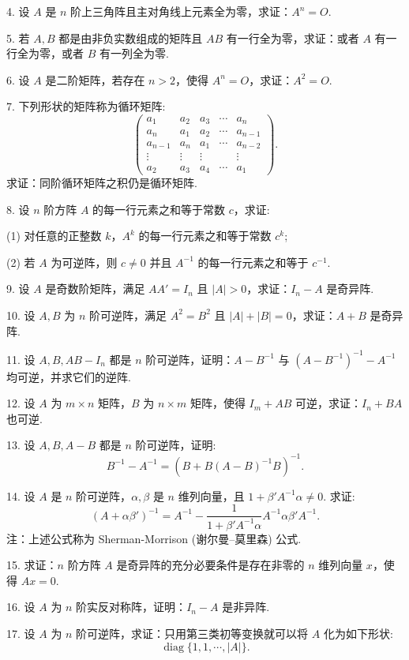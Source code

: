 \documentclass[UTF8,12pt,a4paper,fontset=fandol]{ctexart}
\begin{document}
4. 设 $A$ 是 $n$ 阶上三角阵且主对角线上元素全为零，求证：$A^n=O$.

5. 若 $A,B$ 都是由非负实数组成的矩阵且 $AB$ 有一行全为零，求证：或者 $A$ 有一行全为零，或者 $B$ 有一列全为零.

6. 设 $A$ 是二阶矩阵，若存在 $n>2$，使得 $A^n=O$，求证：$A^2=O$.

7. 下列形状的矩阵称为循环矩阵:
\[
\left(\begin{array}{ccccc}
a_1 & a_2 & a_3 & \cdots & a_n\\
a_n & a_1 & a_2 & \cdots & a_{n-1}\\
a_{n-1} & a_n & a_1 & \cdots & a_{n-2}\\
\vdots & \vdots & \vdots & & \vdots\\
a_2 & a_3 & a_4 & \cdots & a_1
\end{array}\right).
\]
求证：同阶循环矩阵之积仍是循环矩阵.

8. 设 $n$ 阶方阵 $A$ 的每一行元素之和等于常数 $c$，求证:

(1) 对任意的正整数 $k$，$A^k$ 的每一行元素之和等于常数 $c^k$;

(2) 若 $A$ 为可逆阵，则 $c\neq 0$ 并且 $A^{-1}$ 的每一行元素之和等于 $c^{-1}$.

9. 设 $A$ 是奇数阶矩阵，满足 $AA'=I_n$ 且 $|A|>0$，求证：$I_n-A$ 是奇异阵.

10. 设 $A,B$ 为 $n$ 阶可逆阵，满足 $A^2=B^2$ 且 $|A|+|B|=0$，求证：$A+B$ 是奇异阵.

11. 设 $A,B,AB-I_n$ 都是 $n$ 阶可逆阵，证明：$A-B^{-1}$ 与 $(A-B^{-1})^{-1}-A^{-1}$ 均可逆，并求它们的逆阵.

12. 设 $A$ 为 $m\times n$ 矩阵，$B$ 为 $n\times m$ 矩阵，使得 $I_m+AB$ 可逆，求证：$I_n+BA$ 也可逆.

13. 设 $A,B,A-B$ 都是 $n$ 阶可逆阵，证明:
\[
B^{-1}-A^{-1}=\left(B+B(A-B)^{-1}B\right)^{-1}.
\]

14. 设 $A$ 是 $n$ 阶可逆阵，$\alpha,\beta$ 是 $n$ 维列向量，且 $1+\beta'A^{-1}\alpha\neq 0$. 求证:
\[
(A+\alpha\beta')^{-1}=A^{-1}-\frac{1}{1+\beta'A^{-1}\alpha}A^{-1}\alpha\beta'A^{-1}.
\]
注：上述公式称为 Sherman-Morrison (谢尔曼--莫里森) 公式.

15. 求证：$n$ 阶方阵 $A$ 是奇异阵的充分必要条件是存在非零的 $n$ 维列向量 $x$，使得 $Ax=0$.

16. 设 $A$ 为 $n$ 阶实反对称阵，证明：$I_n-A$ 是非异阵.

17. 设 $A$ 为 $n$ 阶可逆阵，求证：只用第三类初等变换就可以将 $A$ 化为如下形状:
\[
\operatorname{diag}\{1,1,\cdots,|A|\}.
\]
\end{document}
